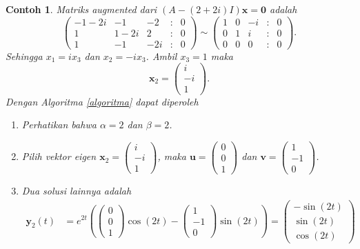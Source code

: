 \documentclass[a4paper]{article}
\theoremstyle{definisi}
\newtheorem{contoh}{Contoh}[subsection]
\numberwithin{equation}{section}
\begin{document}
\begin{contoh}
    Matriks \textit{augmented} dari $(A-(2+2i)I)\mathbf{x} = \mathbf{0}$ adalah
    \begin{equation*}
      \begin{pmatrix}
        -1-2i & -1 & -2 &:& 0\\
        1 & 1-2i & 2 &:& 0\\
        1 & -1 & -2i &:& 0
      \end{pmatrix} \sim \begin{pmatrix}
        1 & 0 & -i &:& 0\\
        0 & 1 & i &:& 0\\
        0 & 0 & 0 &:& 0
      \end{pmatrix}.
    \end{equation*}
    Sehingga $x_1 = ix_3$ dan $x_2 = -ix_3$. Ambil $x_3 = 1$ maka
    \[\mathbf{x}_2 = \begin{pmatrix}i\\-i\\1\end{pmatrix}.\]
    Dengan Algoritma \ref{algoritma} dapat diperoleh
    \begin{enumerate}[label=Langkah \arabic*: ,leftmargin=*]
      \item Perhatikan bahwa $\alpha=2$ dan $\beta=2$. 
      \item Pilih vektor eigen $\mathbf{x}_2 = \begin{pmatrix}i\\-i\\1\end{pmatrix}$, maka $\mathbf{u}= \begin{pmatrix}0\\0\\1\end{pmatrix}$ dan $\mathbf{v} = \begin{pmatrix}1\\-1\\0\end{pmatrix}$.
      \item Dua solusi lainnya adalah
      \begin{align*}
        \mathbf{y}_2(t) &= e^{2t}\left(\begin{pmatrix}0\\0\\1\end{pmatrix}\cos(2t) - \begin{pmatrix}1\\-1\\0\end{pmatrix}\sin(2t)\right)=\begin{pmatrix}-\sin(2t)\\\sin(2t)\\\cos(2t)\end{pmatrix}

\end{align*}
\end{enumerate}
\end{contoh}
\end{document}
